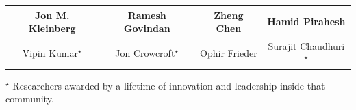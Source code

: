 \begin{table}[!htb]
{\begin{tabular}{|c|c|c|c|}
Jon M. Kleinberg & Ramesh Govindan & Zheng Chen & Hamid Pirahesh\\ \hline
Vipin Kumar$^\star$ & Jon Crowcroft$^\star$ & Ophir Frieder & Surajit Chaudhuri$^\star$\\ \hline
\end{tabular}
\par\medskip\footnotesize{$^\star$ Researchers awarded by a lifetime of innovation and leadership inside that community.}
}
\end{table}
